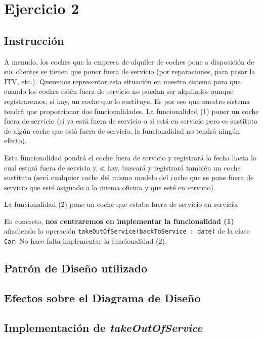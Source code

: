\section{Ejercicio 2}
\subsection*{Instrucción}
A menudo, los coches que la empresa de alquiler de coches pone a disposición de sus clientes se tienen que poner
fuera de servicio (por reparaciones, para pasar la ITV, etc.). Queremos representar esta situación en nuestro sistema
para que cuando los coches estén fuera de servicio no puedan ser alquilados aunque registraremos, si hay, un coche
que lo sustituye. Es por eso que nuestro sistema tendrá que proporcionar dos funcionalidades. La funcionalidad (1) poner 
un coche fuera de servicio (si ya está fuera de servicio o si está en servicio pero es sustituto de algún coche
que está fuera de servicio, la funcionalidad no tendrá ningún efecto).\par
\vspace{0.15cm}
Esta funcionalidad pondrá el coche fuera de servicio y registrará la fecha hasta la cual estará fuera de servicio y, si hay, buscará y registrará también un coche
sustituto (será cualquier coche del mismo modelo del coche que se pone fuera de servicio que esté asignado a la
misma oficina y que esté en servicio).\par
\vspace{0.15cm}
La funcionalidad (2) pone un coche que estaba fuera de servicio en servicio.\par
\vspace{0.15cm}
En concreto, \textbf{nos centraremos en implementar la funcionalidad (1)} añadiendo la operación
\texttt{takeOutOfService(backToService : date)} de la clase \texttt{Car}. No hace falta implementar la funcionalidad (2).

\subsection{Patrón de Diseño utilizado}


\subsection{Efectos sobre el Diagrama de Diseño}

\subsection{Implementación de \textit{takeOutOfService}}

\newpage
